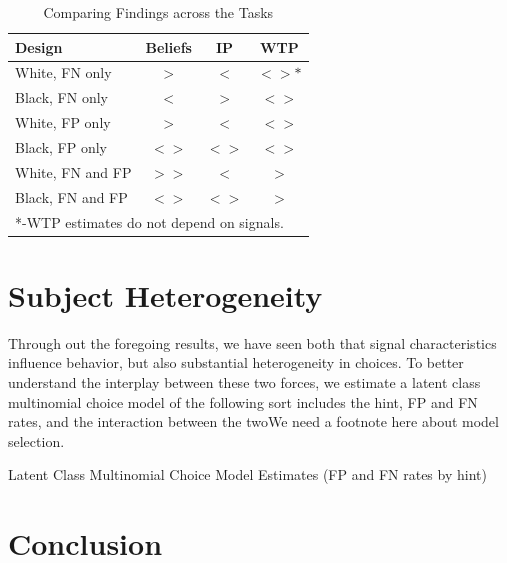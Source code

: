 \documentclass[12pt,a4paper]{article}
\newcommand{\pmt}[1]{{\color{Blue}#1}}
\begin{document}
\begin{table}[H]\centering
\caption{Comparing Findings across the Tasks}
\begin{tabular}{l|c|c|c}
\hline \hline
Design & Beliefs & IP &WTP\\
\hline
White, FN only & $>$ & $<$ & $<>*$ \\
Black, FN only & $<$ & $>$ & $<>$ \\
White, FP only & $>$ & $<$ & $<>$ \\
Black, FP only & $<>$ & $<>$ & $<>$ \\
White, FN and FP & $>>$ & $<$ & $>$ \\
Black, FN and FP & $<>$ & $<>$ & $>$\\
\hline
\multicolumn{4}{l}{*-WTP estimates do not depend on signals.}\\
\end{tabular}
\end{table}



\newpage
\singlespacing
\small

\section{Subject Heterogeneity}

Through out the foregoing results, we have seen both that signal characteristics influence behavior, but also substantial heterogeneity in choices.  To better understand the interplay between these two forces, we estimate a latent class multinomial choice model of the following sort \pmt{includes the hint, FP and FN rates, and the interaction between the two}\pmt{We need a footnote here about model selection}.


\begin{table}[H]
\caption{Latent Class Multinomial Choice Model Estimates (FP and FN rates by hint)}

\end{table}

%










\section{Conclusion}
\end{document}
